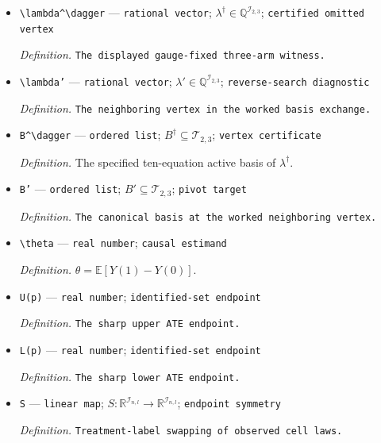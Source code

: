 \documentclass{article}
\begin{document}
\begin{itemize}
  \par\smallskip\noindent\emph{Definition.} The \(a\)-th standard basis vector.
  \item \texttt{\textbackslash{}\allowbreak{}lambda\textasciicircum{}\textbackslash{}\allowbreak{}dagger} --- \texttt{rational vector}; \(\lambda^\dagger\in\mathbb Q^{\mathcal I_{2,3}}\); \texttt{certified omitted vertex}
  \par\smallskip\noindent\emph{Definition.} \texttt{The displayed gauge-\allowbreak{}fixed three-\allowbreak{}arm witness.}
  \item \texttt{\textbackslash{}\allowbreak{}lambda'} --- \texttt{rational vector}; \(\lambda'\in\mathbb Q^{\mathcal I_{2,3}}\); \texttt{reverse-\allowbreak{}search diagnostic}
  \par\smallskip\noindent\emph{Definition.} \texttt{The neighboring vertex in the worked basis exchange.}
  \item \texttt{B\textasciicircum{}\textbackslash{}\allowbreak{}dagger} --- \texttt{ordered list}; \(B^\dagger\subseteq\mathcal T_{2,3}\); \texttt{vertex certificate}
  \par\smallskip\noindent\emph{Definition.} The specified ten-equation active basis of \(\lambda^\dagger\).
  \item \texttt{B'} --- \texttt{ordered list}; \(B'\subseteq\mathcal T_{2,3}\); \texttt{pivot target}
  \par\smallskip\noindent\emph{Definition.} \texttt{The canonical basis at the worked neighboring vertex.}
  \item \texttt{\textbackslash{}\allowbreak{}theta} --- \texttt{real number}; \texttt{causal estimand}
  \par\smallskip\noindent\emph{Definition.} \(\theta=\mathbb E[Y(1)-Y(0)]\).
  \item \texttt{U(p)} --- \texttt{real number}; \texttt{identified-\allowbreak{}set endpoint}
  \par\smallskip\noindent\emph{Definition.} \texttt{The sharp upper ATE endpoint.}
  \item \texttt{L(p)} --- \texttt{real number}; \texttt{identified-\allowbreak{}set endpoint}
  \par\smallskip\noindent\emph{Definition.} \texttt{The sharp lower ATE endpoint.}
  \item \texttt{S} --- \texttt{linear map}; \(S:\mathbb R^{\mathcal I_{n,l}}\to\mathbb R^{\mathcal I_{n,l}}\); \texttt{endpoint symmetry}
  \par\smallskip\noindent\emph{Definition.} \texttt{Treatment-\allowbreak{}label swapping of observed cell laws.}
\end{itemize}
\end{document}
